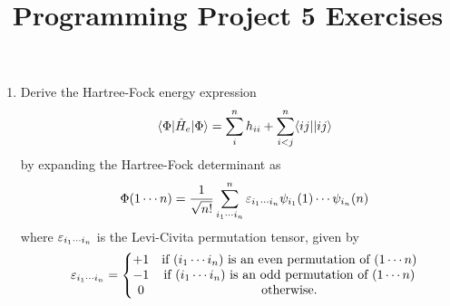 \documentclass[fleqn,11pt]{article}
\title{Programming Project 5 Exercises}
\author{}
\date{}
\begin{document}
\maketitle

\begin{enumerate}
  \item Derive the Hartree-Fock energy expression
\begin{align}
&&
  \langle\Phi|\hat{H}_e|\Phi\rangle
=
  \sum_i^n
  h_{ii}
+
  \sum_{i<j}^n
  \langle ij||ij\rangle
\end{align}
by expanding the Hartree-Fock determinant as
\begin{align}
&&
  \Phi(1\cdots n)
=
  \dfrac{1}{\sqrt{n!}}
  \sum_{i_1\cdots i_n}^n
  \varepsilon_{i_1\cdots i_n}
  \psi_{i_1}(1)\cdots\psi_{i_n}(n)
\end{align}
where $\varepsilon_{i_1\cdots i_n}$ is the Levi-Civita permutation tensor, given by
\begin{align}
&&
  \varepsilon_{i_1\cdots i_n}
=
  \left\{\begin{matrix}
    +1&\text{if $(i_1\cdots i_n)$ is an even permutation of $(1\cdots n)$}\\
    -1&\text{if $(i_1\cdots i_n)$ is an odd permutation of $(1\cdots n)$}\\
    0&\text{otherwise.}
  \end{matrix}\right.
\end{align}


\end{enumerate}
\end{document}

